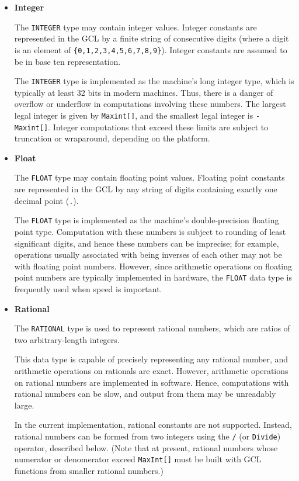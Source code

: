 \begin{itemize}
\item {\bf Integer}

The {\tt INTEGER} type may contain integer values.  Integer constants
are represented in the GCL by a finite string of consecutive digits
(where a digit is an element of \verb+{0,1,2,3,4,5,6,7,8,9}+). Integer
constants are assumed to be in base ten representation.  

The \verb+INTEGER+ type is implemented as the machine's long integer
type, which is typically at least 32 bits in modern machines.  Thus,
there is a danger of overflow or underflow in computations involving
these numbers.  The largest legal integer is given by \verb+Maxint[]+,
and the smallest legal integer is \verb+-Maxint[]+.  Integer
computations that exceed these limits are subject to truncation or
wraparound, depending on the platform.  

\item {\bf Float}

The {\tt FLOAT} type may contain floating point values.  Floating
point constants are represented in the GCL by any string of digits
containing exactly one decimal point (\verb+.+).

The \verb+FLOAT+ type is implemented as the machine's double-precision
floating point type.  Computation with these numbers is subject to
rounding of least significant digits, and hence these numbers can be
imprecise; for example, operations usually associated with being
inverses of each other may not be with floating point
numbers. However, since arithmetic operations on floating point
numbers are typically implemented in hardware, the \verb+FLOAT+ data
type is frequently used when speed is important.

\item {\bf Rational}

The {\tt RATIONAL} type is used to represent rational numbers, which
are ratios of two arbitrary-length integers.   

This data type is capable of precisely representing any rational
number, and arithmetic operations on rationals are exact.  However,
arithmetic operations on rational numbers are implemented in software.
Hence, computations with rational numbers can be slow, and output from
them may be unreadably large.

In the current implementation, rational constants are not supported.
Instead, rational numbers can be formed from two integers using the
{\tt /} (or \verb+Divide+) operator, described below.  (Note that at
present, rational numbers whose numerator or denomerator exceed
\verb+MaxInt[]+ must be built with GCL functions from smaller rational
numbers.)
\end{itemize}

